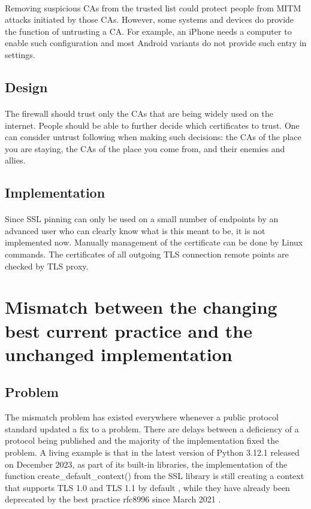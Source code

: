 \documentclass[mscthesis]{usiinfthesis}
\begin{document}
\paragraph{}
Removing suspicious CAs from the trusted list could protect people from MITM attacks initiated by those CAs. However, some systems and devices do provide the function of untrusting a CA. For example, an iPhone needs a computer to enable such configuration and most Android variants do not provide such entry in settings.
\subsection{Design}
\paragraph{}
The firewall should trust only the CAs that are being widely used on the internet. People should be able to further decide which certificates to trust. One can consider untrust following when making such decisions: the CAs of the place you are staying, the CAs of the place you come from, and their enemies and allies.
\subsection{Implementation}
\paragraph{}
Since SSL pinning can only be used on a small number of endpoints by an advanced user who can clearly know what is this meant to be, it is not implemented now. Manually management of the certificate can be done by Linux commands. The certificates of all outgoing TLS connection remote points are checked by TLS proxy.

\section{Mismatch between the changing best current practice and the unchanged implementation}
\subsection{Problem}
The mismatch problem has existed everywhere whenever a public protocol standard updated a fix to a problem. There are delays between a deficiency of a protocol being published and the majority of the implementation fixed the problem. A living example is that in the latest version of Python 3.12.1 released on December 2023, as part of its built-in libraries, the implementation of the function create\_default\_context() from the SSL library is still creating a context that supports TLS 1.0 and TLS 1.1 by default \citep{pyton:ssl}, while they have already been deprecated by the best practice rfc8996 since March 2021 \citep{rfc:notls11}.
\end{document}

